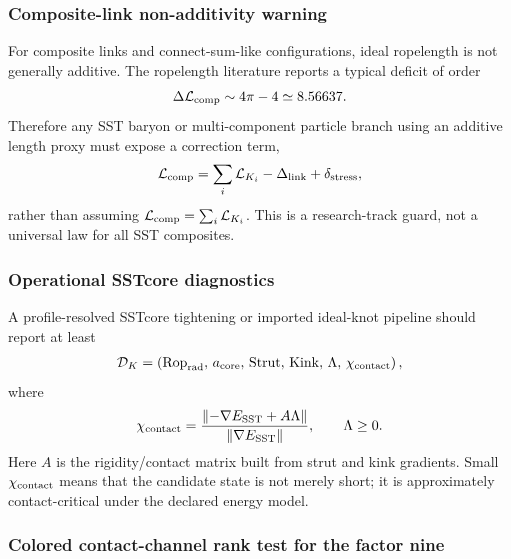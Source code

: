 \subsubsection{Composite-link non-additivity warning}
For composite links and connect-sum-like configurations, ideal ropelength is
not generally additive.  The ropelength literature reports a typical deficit
of order
\begin{align}
    \Delta\mathcal L_{\rm comp}
    \sim
    4\pi-4
    \simeq 8.56637 .
    \label{eq:rt_composite_link_deficit}
\end{align}
Therefore any SST baryon or multi-component particle branch using an additive
length proxy must expose a correction term,
\begin{align}
    \mathcal L_{\rm comp}
    =
    \sum_i\mathcal L_{K_i}
    -\Delta_{\rm link}
    +\delta_{\rm stress},
    \label{eq:rt_composite_nonadditive_length}
\end{align}
rather than assuming $\mathcal L_{\rm comp}=\sum_i\mathcal L_{K_i}$.  This is a
research-track guard, not a universal law for all SST composites.

\subsubsection{Operational SSTcore diagnostics}
A profile-resolved SSTcore tightening or imported ideal-knot pipeline should
report at least
\begin{align}
    \mathcal D_K
    =
    \left(
        \operatorname{Rop}_{\rm rad},\,
        a_{\rm core},\,
        \operatorname{Strut},\,
        \operatorname{Kink},\,
        \Lambda,\,
        \chi_{\rm contact}
    \right),
    \label{eq:rt_sstcore_contact_diagnostics}
\end{align}
where
\begin{align}
    \chi_{\rm contact}
    =
    \frac{\left\|-
        \nabla E_{\rm SST}+A\Lambda\right\|}
         {\left\|\nabla E_{\rm SST}\right\|},
    \qquad
    \Lambda\ge0 .
    \label{eq:rt_contact_residual}
\end{align}
Here $A$ is the rigidity/contact matrix built from strut and kink gradients.
Small $\chi_{\rm contact}$ means that the candidate state is not merely short;
it is approximately contact-critical under the declared energy model.

\subsubsection{Colored contact-channel rank test for the factor nine}
\label{sec:rt_colored_contact_rank_nine}

